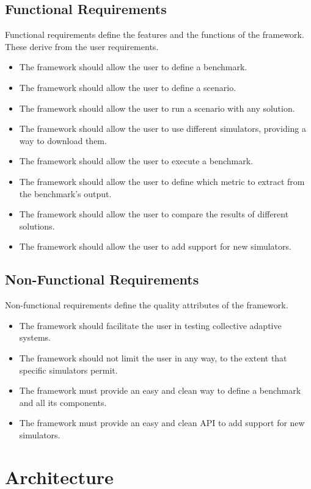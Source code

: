 \documentclass[12pt,a4paper,openright,twoside]{book}
\begin{document}
\subsection{Functional Requirements}
Functional requirements define the features and the functions of the framework.
These derive from the user requirements.

\begin{itemize}
  \item The framework should allow the user to define a benchmark.
  \item The framework should allow the user to define a scenario.
  \item The framework should allow the user to run a scenario with any solution.
  \item The framework should allow the user to use different simulators, providing a way to download them.
  \item The framework should allow the user to execute a benchmark.
  \item The framework should allow the user to define which metric to extract from the benchmark's output.
  \item The framework should allow the user to compare the results of different solutions.
  \item The framework should allow the user to add support for new simulators.
\end{itemize}

\subsection{Non-Functional Requirements}
Non-functional requirements define the quality attributes of the framework.

\begin{itemize}
  \item The framework should facilitate the user in testing collective adaptive systems.
  \item The framework should not limit the user in any way, to the extent that specific simulators permit.
  \item The framework must provide an easy and clean way to define a benchmark and all its components.
  \item The framework must provide an easy and clean API to add support for new simulators.
\end{itemize}

\section{Architecture}
\end{document}
